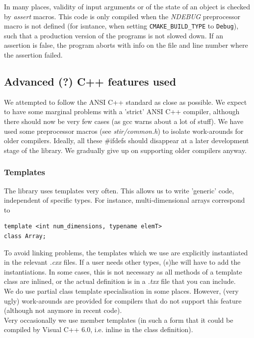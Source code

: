 \documentclass{article}
\begin{document}
In many places, validity of input arguments or of the state of 
an object is checked by \textit{assert} macros. This code is only 
compiled when the \textit{NDEBUG} preprocessor macro is not defined (for isntance,
when setting \texttt{CMAKE\_BUILD\_TYPE} to \texttt{Debug}), 
such that a production version of the programs 
is not slowed down. If an assertion is false, the program aborts 
with info on the file and line number where the assertion failed.

\subsection{\label{ssect:AdvancedCppFeatures}
Advanced (?) C++ features used}

We attempted to follow the ANSI C++ standard as close as possible. 
We expect to have some marginal problems with a 'strict' ANSI 
C++ compiler, although there should now be very few cases (as 
gcc warns about a lot of stuff). We have used some preprocessor 
macros (see \textit{stir/common.h}) to isolate work-arounds for older 
compilers. Ideally, all these \#ifdefs should disappear at a 
later development stage of the library. We gradually give up 
on supporting older compilers anyway.


\subsubsection{Templates}
The library uses templates very often. This allows us to write 
'generic' code, independent of specific types. For instance, 
multi-dimensional arrays correspond to 

\begin{verbatim}
template <int num_dimensions, typename elemT>
class Array;
\end{verbatim}


To avoid linking problems, the templates which we use are explicitly 
instantiated in the relevant \textit{.cxx} files. If a user needs 
other types, (s)he will have to add the instantiations. In some cases,
this is not necessary as all methods of a template class are inlined, or the
actual definition is in a \textit{.txx} file that you can include.\\
We do use partial class template specialisation in some places. 
However, (very ugly) work-arounds are provided for compilers 
that do not support this feature (although not anymore in recent code).\\
Very occasionally we use member templates (in such a form that 
it could be compiled by Visual C++ 6.0, i.e. inline in the class definition). 
\end{document}
